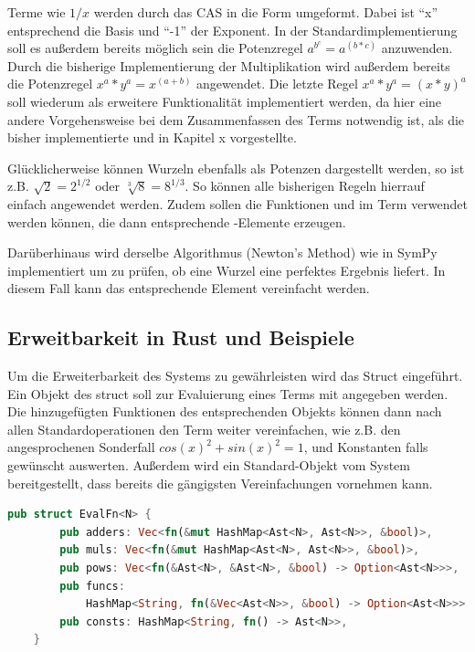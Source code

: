\documentclass[11pt,a4paper, ngerman]{article}
\begin{document}
Terme wie $1/x$ werden durch das CAS in die Form  umgeformt. Dabei ist ``x'' entsprechend die Basis und ``-1'' der Exponent. In der Standardimplementierung soll es außerdem bereits möglich sein die Potenzregel $a^{b^{c}} = a^{(b*c)}$ anzuwenden. Durch die bisherige Implementierung der Multiplikation wird außerdem bereits die Potenzregel $x^a*y^a = x^{(a+b)}$ angewendet. Die letzte Regel $x^a*y^a = (x*y)^a$ soll wiederum als erweitere Funktionalität implementiert werden, da hier eine andere Vorgehensweise bei dem Zusammenfassen des Terms notwendig ist, als die bisher implementierte und in Kapitel x vorgestellte.

Glücklicherweise können Wurzeln ebenfalls als Potenzen dargestellt werden, so ist z.B. $\sqrt{2} = 2^{1/2}$ oder $\sqrt[3]{8} = 8^{1/3}$. So können alle bisherigen Regeln hierrauf einfach angewendet werden. Zudem sollen die Funktionen  und  im Term verwendet werden können, die dann entsprechende -Elemente erzeugen.

Darüberhinaus wird derselbe Algorithmus (Newton's Method) wie in SymPy implementiert um zu prüfen, ob eine Wurzel eine perfektes Ergebnis liefert. In diesem Fall kann das entsprechende Element vereinfacht werden.

\subsection{Erweitbarkeit in Rust und Beispiele}
Um die Erweiterbarkeit des Systems zu gewährleisten wird das Struct  eingeführt. Ein Objekt des struct soll zur Evaluierung eines Terms mit angegeben werden. Die hinzugefügten Funktionen des entsprechenden Objekts können dann nach allen Standardoperationen den Term weiter vereinfachen, wie z.B. den angesprochenen Sonderfall $cos(x)^2+sin(x)^2 = 1$, und Konstanten falls gewünscht auswerten. Außerdem wird ein Standard-Objekt vom System bereitgestellt, dass bereits die gängigsten Vereinfachungen vornehmen kann.

\begin{lstlisting}[language=rust, caption={Defintion EvalFn}]
    pub struct EvalFn<N> {
        pub adders: Vec<fn(&mut HashMap<Ast<N>, Ast<N>>, &bool)>,
        pub muls: Vec<fn(&mut HashMap<Ast<N>, Ast<N>>, &bool)>,
        pub pows: Vec<fn(&Ast<N>, &Ast<N>, &bool) -> Option<Ast<N>>>,
        pub funcs: 
            HashMap<String, fn(&Vec<Ast<N>>, &bool) -> Option<Ast<N>>>,
        pub consts: HashMap<String, fn() -> Ast<N>>,
    }
\end{lstlisting}
\end{document}
